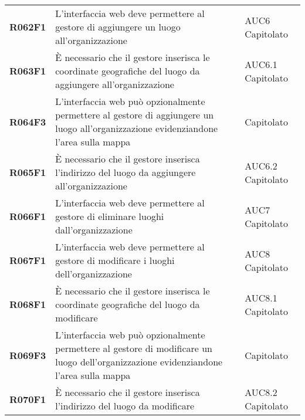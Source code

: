 \documentclass[../analisi-dei-requisiti.tex]{subfiles}
\begin{document}
\begin{longtable}[H]{>{\centering\bfseries}m{3cm} >{\centering}m{10cm} >{\centering\arraybackslash}m{3cm}}
  R062F1                               & L'interfaccia web deve permettere al gestore di aggiungere un luogo all'organizzazione                                                                                                                  & AUC6 Capitolato             \\
  R063F1                               & È necessario che il gestore inserisca le coordinate geografiche del luogo da aggiungere all'organizzazione                                                                                              & AUC6.1 Capitolato           \\
  R064F3                               & L'interfaccia web può opzionalmente permettere al gestore di aggiungere un luogo all'organizzazione evidenziandone l'area sulla mappa                                                                   & Capitolato                  \\
  R065F1                               & È necessario che il gestore inserisca l'indirizzo del luogo da aggiungere all'organizzazione                                                                                                            & AUC6.2 Capitolato           \\
  R066F1                               & L'interfaccia web deve permettere al gestore di eliminare luoghi dall'organizzazione                                                                                                                    & AUC7 Capitolato             \\
  R067F1                               & L'interfaccia web deve permettere al gestore di modificare i luoghi dell'organizzazione                                                                                                                 & AUC8 Capitolato             \\
  R068F1                               & È necessario che il gestore inserisca le coordinate geografiche del luogo da modificare                                                                                                                 & AUC8.1 Capitolato           \\
  R069F3                               & L'interfaccia web può opzionalmente permettere al gestore di modificare un luogo dell'organizzazione evidenziandone l'area sulla mappa                                                                  & Capitolato                    \\
  R070F1                               & È necessario che il gestore inserisca l'indirizzo del luogo da modificare                                                                                                                               & AUC8.2 Capitolato           \\

\end{longtable}
\end{document}
